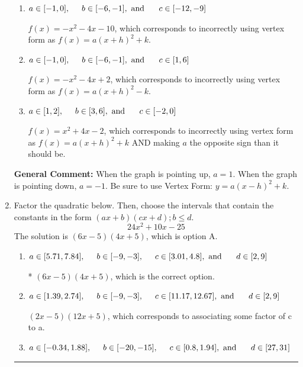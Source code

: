 \documentclass{extbook}[14pt]
\newcommand{\litem}[1]{\item #1

\rule{\textwidth}{0.4pt}}
\begin{document}
\begin{enumerate}
{\begin{enumerate}[label=\Alph*.]
$f(x)=x^{2} -4 x -2$, which corresponds to making $a$ the opposite sign than it should be.
\item \( a \in [-1, 0], \hspace*{5mm} b \in [-6, -1], \text{ and } \hspace*{5mm} c \in [-12, -9] \)

$f(x)=-x^{2} -4 x -10$, which corresponds to incorrectly using vertex form as $f(x) = a(x+h)^2+k$.
\item \( a \in [-1, 0], \hspace*{5mm} b \in [-6, -1], \text{ and } \hspace*{5mm} c \in [1, 6] \)

$f(x)=-x^{2} -4 x + 2$, which corresponds to incorrectly using vertex form as $f(x) = a(x+h)^2 - k$.
\item \( a \in [1, 2], \hspace*{5mm} b \in [3, 6], \text{ and } \hspace*{5mm} c \in [-2, 0] \)

$f(x)=x^{2} +4 x -2$, which corresponds to incorrectly using vertex form as $f(x) = a(x+h)^2+k$ AND making $a$ the opposite sign than it should be.
\end{enumerate}

\textbf{General Comment:} When the graph is pointing up, $a=1$. When the graph is pointing down, $a=-1$. Be sure to use Vertex Form: $y = a(x-h)^2+k$.
}
\litem{
Factor the quadratic below. Then, choose the intervals that contain the constants in the form $(ax+b)(cx+d); b \leq d.$
\[ 24x^{2} +10 x -25 \]The solution is \( (6x -5)(4x + 5) \), which is option A.\begin{enumerate}[label=\Alph*.]
\item \( a \in [5.71, 7.84], \hspace*{5mm} b \in [-9, -3], \hspace*{5mm} c \in [3.01, 4.8], \text{ and } \hspace*{5mm} d \in [2, 9] \)

* $(6x -5)(4x + 5)$, which is the correct option.
\item \( a \in [1.39, 2.74], \hspace*{5mm} b \in [-9, -3], \hspace*{5mm} c \in [11.17, 12.67], \text{ and } \hspace*{5mm} d \in [2, 9] \)

 $(2x -5)(12x + 5)$, which corresponds to associating some factor of c to a.
\item \( a \in [-0.34, 1.88], \hspace*{5mm} b \in [-20, -15], \hspace*{5mm} c \in [0.8, 1.94], \text{ and } \hspace*{5mm} d \in [27, 31] \)


\end{enumerate}}
\end{enumerate}
\end{document}
